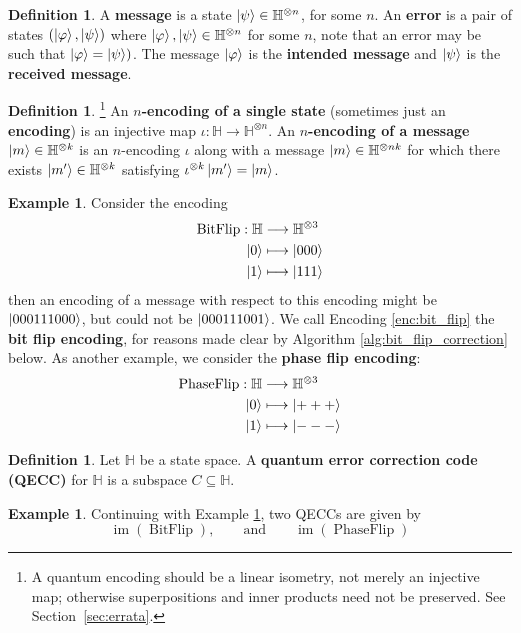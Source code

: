 \documentclass[12pt]{article}
\theoremstyle{plain}
\theoremstyle{definition}
\newtheorem{defn}[thm]{Definition} %
\newtheorem{example}[thm]{Example}
\newcommand{\bb}[1]{\mathbb{#1}}
\newcommand{\lto}{\longrightarrow}
\begin{document}
\begin{defn}
A \textbf{message} is a state $\ket{\psi} \in \bb{H}^{\otimes n}$, for some $n$. An \textbf{error} is a pair of states $(\ket{\varphi},\ket{\psi})$ where $\ket{\varphi},\ket{\psi} \in \bb{H}^{\otimes n}$ for some $n$, note that an error may be such that $\ket{\varphi} = \ket{\psi})$.  The message $\ket{\varphi}$ is the \textbf{intended message} and $\ket{\psi}$ is the \textbf{received message}. 
\end{defn}
\begin{defn}\footnote{A quantum encoding should be a linear isometry, not merely an injective map; otherwise superpositions and inner products need not be preserved. See Section~\ref{sec:errata}.}
An \textbf{$n$-encoding of a single state} (sometimes just an \textbf{encoding}) is an injective map $\iota: \bb{H} \lto \bb{H}^{\otimes n}$. An \textbf{$n$-encoding of a message} $\ket{m} \in \bb{H}^{\otimes k}$ is an $n$-encoding $\iota$ along with a message $\ket{m} \in \bb{H}^{\otimes nk}$ for which there exists $\ket{m'} \in \bb{H}^{\otimes k}$ satisfying $\iota^{\otimes k}\ket{m'} = \ket{m}$.
\end{defn}
\begin{example}\label{ex:bit_flip_coding}
Consider the encoding
\begin{align}\label{enc:bit_flip}
\operatorname{BitFlip}: \bb{H} &\lto \bb{H}^{\otimes 3}\\
\ket{0} &\longmapsto \ket{000}\\
\ket{1} &\longmapsto \ket{111}
\end{align}
then an encoding of a message with respect to this encoding might be $\ket{000111000}$, but could not be $\ket{000111001}$. We call Encoding \ref{enc:bit_flip} the \textbf{bit flip encoding}, for reasons made clear by Algorithm \ref{alg:bit_flip_correction} below. As another example, we consider the \textbf{phase flip encoding}:
\begin{align*}
\operatorname{PhaseFlip}: \bb{H} &\lto \bb{H}^{\otimes 3}\\
\ket{0} &\longmapsto \ket{+++}\\
\ket{1} &\longmapsto \ket{---}
\end{align*}
\end{example}
\begin{defn}
Let $\bb{H}$ be a state space. A \textbf{quantum error correction code (QECC)} for $\bb{H}$ is a subspace $C \subseteq \bb{H}$.
\end{defn}
\begin{example}
Continuing with Example \ref{ex:bit_flip_coding}, two QECCs are given by
\begin{equation}
\operatorname{im}(\operatorname{BitFlip}),\qquad\text{and}\qquad\operatorname{im}(\operatorname{PhaseFlip})
\end{equation}
\end{example}
\end{document}
